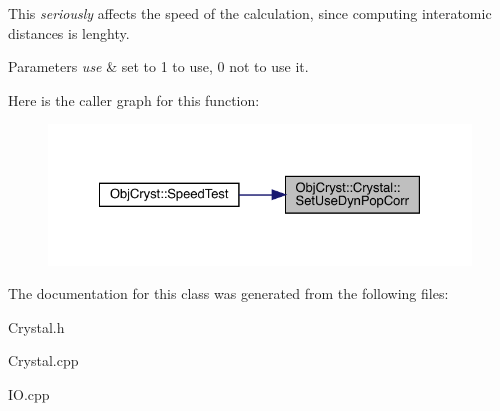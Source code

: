 This {\itshape seriously} affects the speed of the calculation, since computing interatomic distances is lenghty. 
\begin{DoxyParams}{Parameters}
{\em use} & set to 1 to use, 0 not to use it. \\
\hline
\end{DoxyParams}
Here is the caller graph for this function\+:
\nopagebreak
\begin{figure}[H]
\begin{center}
\leavevmode
\includegraphics[width=328pt]{class_obj_cryst_1_1_crystal_a511c3fcea43446634232eb6df345db9d_icgraph}
\end{center}
\end{figure}


The documentation for this class was generated from the following files\+:\begin{DoxyCompactItemize}
\item 
Crystal.\+h\item 
Crystal.\+cpp\item 
I\+O.\+cpp\end{DoxyCompactItemize}
